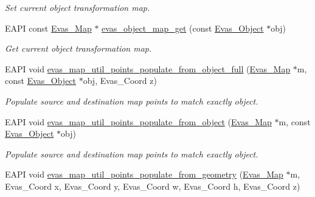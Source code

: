 \begin{DoxyCompactItemize}
\begin{DoxyCompactList}\small\item\em Set current object transformation map. \item\end{DoxyCompactList}\item 
EAPI const \hyperlink{group__Evas__Object__Group__Map_gae94fcea124ae4135e8bb15a014b334dc}{Evas\_\-Map} $\ast$ \hyperlink{Evas_8h_aa1d3f8febc923e8225f727afc08d21f2}{evas\_\-object\_\-map\_\-get} (const \hyperlink{group__Evas__Object__Group_ga9e19e6dd1f517a0ba437c0114d3e7c97}{Evas\_\-Object} $\ast$obj)
\begin{DoxyCompactList}\small\item\em Get current object transformation map. \item\end{DoxyCompactList}\item 
EAPI void \hyperlink{Evas_8h_af71ab80fefb757aea040eaae33fd06e6}{evas\_\-map\_\-util\_\-points\_\-populate\_\-from\_\-object\_\-full} (\hyperlink{group__Evas__Object__Group__Map_gae94fcea124ae4135e8bb15a014b334dc}{Evas\_\-Map} $\ast$m, const \hyperlink{group__Evas__Object__Group_ga9e19e6dd1f517a0ba437c0114d3e7c97}{Evas\_\-Object} $\ast$obj, Evas\_\-Coord z)
\begin{DoxyCompactList}\small\item\em Populate source and destination map points to match exactly object. \item\end{DoxyCompactList}\item 
EAPI void \hyperlink{Evas_8h_ac2d35f2242ce06afe5b9aff79ed33487}{evas\_\-map\_\-util\_\-points\_\-populate\_\-from\_\-object} (\hyperlink{group__Evas__Object__Group__Map_gae94fcea124ae4135e8bb15a014b334dc}{Evas\_\-Map} $\ast$m, const \hyperlink{group__Evas__Object__Group_ga9e19e6dd1f517a0ba437c0114d3e7c97}{Evas\_\-Object} $\ast$obj)
\begin{DoxyCompactList}\small\item\em Populate source and destination map points to match exactly object. \item\end{DoxyCompactList}\item 
EAPI void \hyperlink{Evas_8h_adb28b64c445931d92eeeab2c3fb52286}{evas\_\-map\_\-util\_\-points\_\-populate\_\-from\_\-geometry} (\hyperlink{group__Evas__Object__Group__Map_gae94fcea124ae4135e8bb15a014b334dc}{Evas\_\-Map} $\ast$m, Evas\_\-Coord x, Evas\_\-Coord y, Evas\_\-Coord w, Evas\_\-Coord h, Evas\_\-Coord z)

\end{DoxyCompactItemize}
